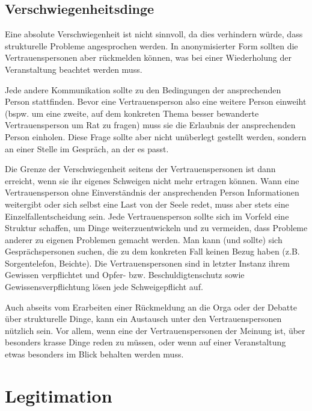\documentclass[DIV=calc]{scrartcl}
\begin{document}
\subsection{Verschwiegenheitsdinge}

Eine absolute Verschwiegenheit ist nicht sinnvoll, da dies verhindern würde, dass strukturelle Probleme angesprochen werden. In anonymisierter Form sollten die Vertrauenspersonen aber rückmelden können, was bei einer Wiederholung der Veranstaltung beachtet werden muss.

Jede andere Kommunikation sollte zu den Bedingungen der ansprechenden Person stattfinden. Bevor eine Vertrauensperson also eine weitere Person einweiht (bspw. um eine zweite, auf dem konkreten Thema besser bewanderte Vertrauensperson um Rat zu fragen) muss sie die Erlaubnis der ansprechenden Person einholen. Diese Frage sollte aber nicht unüberlegt gestellt werden, sondern an einer Stelle im Gespräch, an der es passt.

Die Grenze der Verschwiegenheit seitens der Vertrauenspersonen ist dann erreicht, wenn sie ihr eigenes Schweigen nicht mehr ertragen können. Wann eine Vertrauensperson ohne Einverständnis der ansprechenden Person Informationen weitergibt oder sich selbst eine Last von der Seele redet, muss aber stets eine Einzelfallentscheidung sein.
Jede Vertrauensperson sollte sich im Vorfeld eine Struktur schaffen, um Dinge weiterzuentwickeln und zu vermeiden, dass Probleme anderer zu eigenen Problemen gemacht werden. Man kann (und sollte) sich Gesprächspersonen suchen, die zu dem konkreten Fall keinen Bezug haben (z.B. Sorgentelefon, Beichte). Die Vertrauenspersonen sind in letzter Instanz ihrem Gewissen verpflichtet und Opfer- bzw. Beschuldigtenschutz sowie Gewissensverpflichtung lösen jede Schweigepflicht auf.

Auch abseits vom Erarbeiten einer Rückmeldung an die Orga oder der Debatte über strukturelle Dinge, kann ein Austausch unter den Vertrauenspersonen nützlich sein. Vor allem, wenn eine der Vertrauenspersonen der Meinung ist, über besonders krasse Dinge reden zu müssen, oder wenn auf einer Veranstaltung etwas besonders im Blick behalten werden muss. 

\section{Legitimation}
\end{document}
